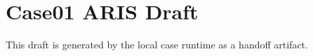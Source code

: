 \documentclass{article}
\begin{document}
            \section*{Case01 ARIS Draft}
            This draft is generated by the local case runtime as a handoff artifact.
            
\end{document}
